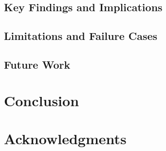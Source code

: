 \documentclass[journal,onecolumn,draftcls]{IEEEtran}
\begin{document}
\subsection{Key Findings and Implications}
\label{sec:discuss-findings}

\subsection{Limitations and Failure Cases}
\label{sec:discuss-limitations}


\subsection{Future Work}
\label{sec:discuss-future}


\section{Conclusion}
\label{sec:conclusion}


\section*{Acknowledgments}



{

  
  
}
\end{document}
